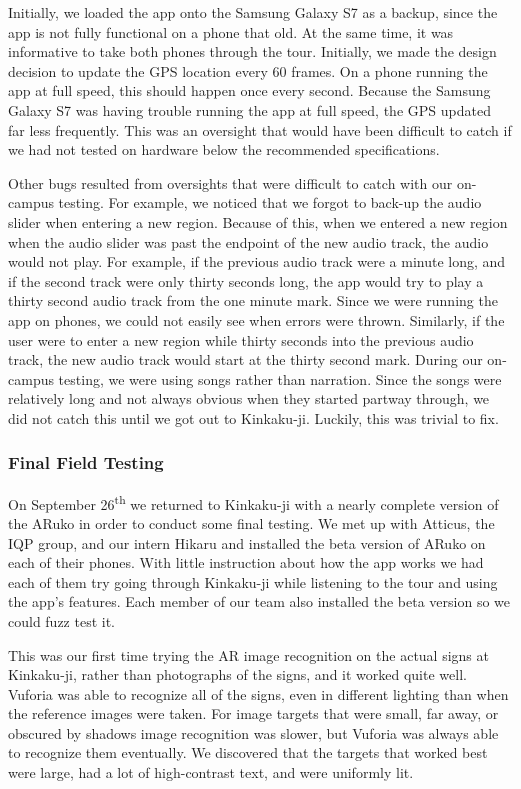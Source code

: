 \documentclass[a4paper, 10pt, american, titlepage]{article}
\begin{document}
Initially, we loaded the app onto the Samsung Galaxy S7 as a backup, since the
app is not fully functional on a phone that old. At the same time, it was
informative to take both phones through the tour. Initially, we made the design
decision to update the GPS location every 60 frames. On a phone running the app
at full speed, this should happen once every second. Because the Samsung Galaxy
S7 was having trouble running the app at full speed, the GPS updated far less
frequently. This was an oversight that would have been difficult to catch if we
had not tested on hardware below the recommended specifications.

Other bugs resulted from oversights that were difficult to catch with our
on-campus testing.  For example, we noticed that we forgot to back-up the audio
slider when entering a new region.  Because of this, when we entered a new
region when the audio slider was past the endpoint of the new audio track, the
audio would not play. For example, if the previous audio track were a minute
long, and if the second track were only thirty seconds long, the app would try
to play a thirty second audio track from the one minute mark. Since we were
running the app on phones, we could not easily see when errors were thrown.
Similarly, if the user were to enter a new region while thirty seconds into the
previous audio track, the new audio track would start at the thirty second
mark. During our on-campus testing, we were using songs rather than narration.
Since the songs were relatively long and not always obvious when they started
partway through, we did not catch this until we got out to Kinkaku-ji. Luckily,
this was trivial to fix.

\subsubsection{Final Field Testing}
\label{sec:finalFieldTesting}

On September 26\textsuperscript{th} we returned to Kinkaku-ji with a nearly
complete version of the ARuko in order to conduct some final testing. We met up
with Atticus, the IQP group, and our intern Hikaru and installed the beta
version of ARuko on each of their phones. With little instruction about how the
app works we had each of them try going through Kinkaku-ji while listening to
the tour and using the app's features. Each member of our team also installed
the beta version so we could fuzz test it.

This was our first time trying the AR image recognition on the actual signs at
Kinkaku-ji, rather than photographs of the signs, and it worked quite well.
Vuforia was able to recognize all of the signs, even in different lighting than
when the reference images were taken. For image targets that were small, far
away, or obscured by shadows image recognition was slower, but Vuforia was
always able to recognize them eventually. We discovered that the targets that
worked best were large, had a lot of high-contrast text, and were uniformly lit.
\end{document}
